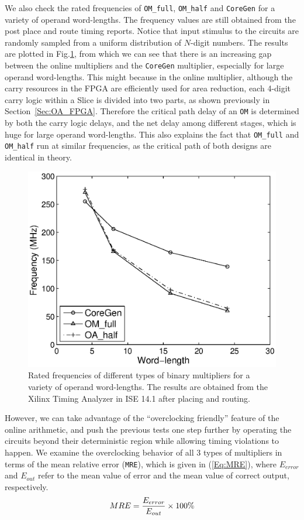 \documentclass[conference]{IEEEtran}
\begin{document}
We also check the rated frequencies of \texttt{OM\_full}, \texttt{OM\_half} and \texttt{CoreGen} for a variety of operand word-lengths. The frequency values are still obtained from the post place and route timing reports. Notice that input stimulus to the circuits are randomly sampled from a uniform distribution of $N$-digit numbers. The results are plotted in Fig.\ref{Fig:OM_Freq}, from which we can see that there is an increasing gap between the online multipliers and the \texttt{CoreGen} multiplier, especially for large operand word-lengths. This might because in the online multiplier, although the carry resources in the FPGA are efficiently used for area reduction, each 4-digit carry logic within a Slice is divided into two parts, as shown previously in Section~\ref{Sec:OA_FPGA}. Therefore the critical path delay of an \texttt{OM} is determined by both the carry logic delays, and the net delay among different stages, which is huge for large operand word-lengths. This also explains the fact that \texttt{OM\_full} and \texttt{OM\_half} run at similar frequencies, as the critical path of both designs are identical in theory.

\begin{figure}[tbp]
	\centering
	\includegraphics[width=.48\textwidth]{./Figures/Exp/OM_Freq.eps}
	\caption{Rated frequencies of different types of binary multipliers for a variety of operand word-lengths. The results are obtained from the Xilinx Timing Analyzer in ISE 14.1 after placing and routing.}
	\label{Fig:OM_Freq}

\end{figure}

However, we can take advantage of the ``overclocking friendly'' feature of the online arithmetic, and push the previous tests one step further by operating the circuits beyond their deterministic region while allowing timing violations to happen. We examine the overclocking behavior of all 3 types of multipliers in terms of the mean relative error (\texttt{MRE}), which is given in (\ref{Eq:MRE}), where $E_{error}$ and $E_{out}$ refer to the mean value of error and the mean value of correct output, respectively.
%
\begin{eqnarray}\label{Eq:MRE}
  MRE=\frac{E_{error}}{E_{out}}\times100\%
  \vspace{-1ex}
\end{eqnarray}
\end{document}
